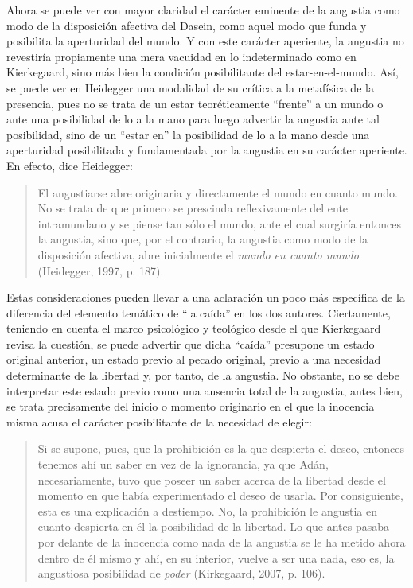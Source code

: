 \documentclass[]{article}
\begin{document}
Ahora se puede ver con mayor claridad el carácter eminente de la angustia como modo de la disposición afectiva del Dasein, como aquel modo que funda y posibilita la aperturidad del mundo. Y con este carácter aperiente, la angustia no revestiría propiamente una mera vacuidad en lo indeterminado como en Kierkegaard, sino más bien la condición posibilitante del estar-en-el-mundo. Así, se puede ver en Heidegger una modalidad de su crítica a la metafísica de la presencia, pues no se trata de un estar teoréticamente ``frente'' a un mundo o ante una posibilidad de lo a la mano para luego advertir la angustia ante tal posibilidad, sino de un ``estar en'' la posibilidad de lo a la mano desde una aperturidad posibilitada y fundamentada por la angustia en su carácter aperiente. En efecto, dice Heidegger:

\begin{quote}
El angustiarse abre originaria y directamente el mundo en cuanto mundo. No se trata de que primero se prescinda reflexivamente del ente intramundano y se piense tan sólo el mundo, ante el cual surgiría entonces la angustia, sino que, por el contrario, la angustia como modo de la disposición afectiva, abre inicialmente el \emph{mundo en cuanto mundo} (Heidegger, 1997, p. 187).
\end{quote}

Estas consideraciones pueden llevar a una aclaración un poco más específica de la diferencia del elemento temático de ``la caída'' en los dos autores. Ciertamente, teniendo en cuenta el marco psicológico y teológico desde el que Kierkegaard revisa la cuestión, se puede advertir que dicha ``caída'' presupone un estado original anterior, un estado previo al pecado original, previo a una necesidad determinante de la libertad y, por tanto, de la angustia. No obstante, no se debe interpretar este estado previo como una ausencia total de la angustia, antes bien, se trata precisamente del inicio o momento originario en el que la inocencia misma acusa el carácter posibilitante de la necesidad de elegir:

\begin{quote}
Si se supone, pues, que la prohibición es la que despierta el deseo, entonces tenemos ahí un saber en vez de la ignorancia, ya que Adán, necesariamente, tuvo que poseer un saber acerca de la libertad desde el momento en que había experimentado el deseo de usarla. Por consiguiente, esta es una explicación a destiempo. No, la prohibición le angustia en cuanto despierta en él la posibilidad de la libertad. Lo que antes pasaba por delante de la inocencia como nada de la angustia se le ha metido ahora dentro de él mismo y ahí, en su interior, vuelve a ser una nada, eso es, la angustiosa posibilidad de \emph{poder} (Kirkegaard, 2007, p. 106).
\end{quote}
\end{document}
